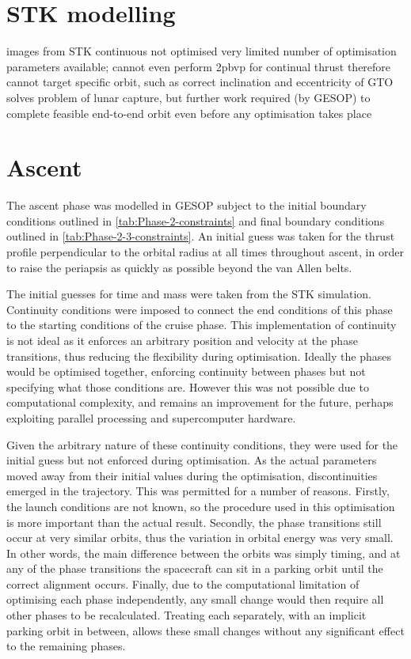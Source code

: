 \clearpage

\section{STK modelling}

images from STK
continuous
not optimised
very limited number of optimisation parameters available; cannot even perform 2pbvp for continual thrust
therefore cannot target specific orbit, such as correct inclination and eccentricity of GTO
solves problem of lunar capture, but further work required (by GESOP) to complete feasible end-to-end orbit even before any optimisation takes place

\section{Ascent} 
The ascent phase was modelled in GESOP subject to the initial boundary conditions outlined in \autoref{tab:Phase-2-constraints} and final boundary conditions outlined in \autoref{tab:Phase-2-3-constraints}. An initial guess was taken for the thrust profile perpendicular to the orbital radius at all times throughout ascent, in order to raise the periapsis as quickly as possible beyond the van Allen belts.

The initial guesses for time and mass were taken from the STK simulation. Continuity conditions were imposed to connect the end conditions of this phase to the starting conditions of the cruise phase. This implementation of continuity is not ideal as it enforces an arbitrary position and velocity at the phase transitions, thus reducing the flexibility during optimisation. Ideally the phases would be optimised together, enforcing continuity between phases but not specifying what those conditions are. However this was not possible due to computational complexity, and remains an improvement for the future, perhaps exploiting parallel processing and supercomputer hardware.

Given the arbitrary nature of these continuity conditions, they were used for the initial guess but not enforced during optimisation. As the actual parameters moved away from their initial values during the optimisation, discontinuities emerged in the trajectory. This was permitted for a number of reasons. Firstly, the launch conditions are not known, so the procedure used in this optimisation is more important than the actual result. Secondly, the phase transitions still occur at very similar orbits, thus the variation in orbital energy was very small. In other words, the main difference between the orbits was simply timing, and at any of the phase transitions the spacecraft can sit in a parking orbit until the correct alignment occurs. Finally, due to the computational limitation of optimising each phase independently, any small change would then require all other phases to be recalculated. Treating each separately, with an implicit parking orbit in between, allows these small changes without any significant effect to the remaining phases.

